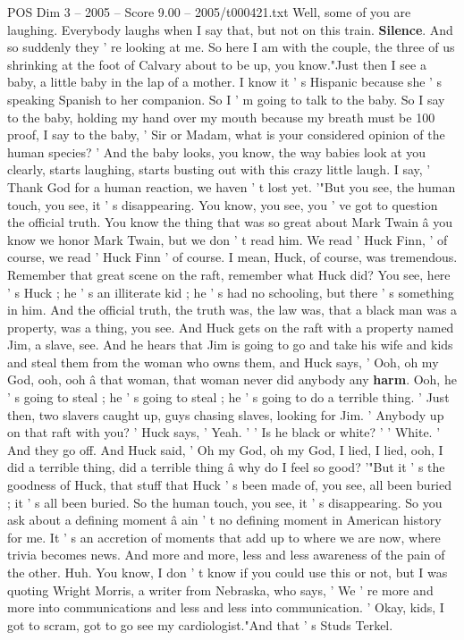 \begin{textsample}{POS Dim 3 – 2005 – Score 9.00 – 2005/t000421.txt}
Well, some of you are laughing.
Everybody laughs when I say that, but not on this train. \textbf{Silence}.
And so suddenly they ' re looking at me.
So here I am with the couple, the three of us shrinking at the foot of Calvary about to be up, you know."Just then I see a baby, a little baby in the lap of a mother.
I know it ' s Hispanic because she ' s speaking Spanish to her companion.
So I ' m going to talk to the baby.
So I say to the baby, holding my hand over my mouth because my breath must be 100 proof, I say to the baby, ' Sir or Madam, what is your considered opinion of the human species? ' And the baby looks, you know, the way babies look at you clearly, starts laughing, starts busting out with this crazy little laugh.
I say, ' Thank God for a human reaction, we haven ' t lost yet. '"But you see, the human touch, you see, it ' s disappearing.
You know, you see, you ' ve got to question the official truth.
You know the thing that was so great about Mark Twain â you know we honor Mark Twain, but we don ' t read him.
We read ' Huck Finn, ' of course, we read ' Huck Finn ' of course.
I mean, Huck, of course, was tremendous.
Remember that great scene on the raft, remember what Huck did?
You see, here ' s Huck ; he ' s an illiterate kid ; he ' s had no schooling, but there ' s something in him.
And the official truth, the truth was, the law was, that a black man was a property, was a thing, you see.
And Huck gets on the raft with a property named Jim, a slave, see.
And he hears that Jim is going to go and take his wife and kids and steal them from the woman who owns them, and Huck says, ' Ooh, oh my God, ooh, ooh â that woman, that woman never did anybody any \textbf{harm}.
Ooh, he ' s going to steal ; he ' s going to steal ; he ' s going to do a terrible thing. ' Just then, two slavers caught up, guys chasing slaves, looking for Jim. ' Anybody up on that raft with you? ' Huck says, ' Yeah. ' ' Is he black or white? ' ' White. ' And they go off.
And Huck said, ' Oh my God, oh my God, I lied, I lied, ooh, I did a terrible thing, did a terrible thing â why do I feel so good? '"But it ' s the goodness of Huck, that stuff that Huck ' s been made of, you see, all been buried ; it ' s all been buried.
So the human touch, you see, it ' s disappearing.
So you ask about a defining moment â ain ' t no defining moment in American history for me.
It ' s an accretion of moments that add up to where we are now, where trivia becomes news.
And more and more, less and less awareness of the pain of the other.
Huh.
You know, I don ' t know if you could use this or not, but I was quoting Wright Morris, a writer from Nebraska, who says, ' We ' re more and more into communications and less and less into communication. ' Okay, kids, I got to scram, got to go see my cardiologist."And that ' s Studs Terkel.

\end{textsample}
